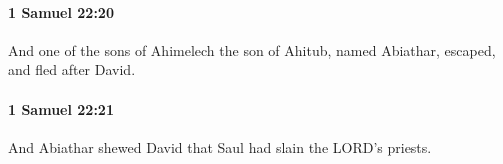 		\paragraph{1 Samuel 22:20} %
			\label{1SAMUEL-22-20}

			And one of the sons of Ahimelech the son of Ahitub, named Abiathar, escaped, and fled after David.


		\paragraph{1 Samuel 22:21} %
			\label{1SAMUEL-22-21}

			And Abiathar shewed David that Saul had slain the LORD’s priests.


